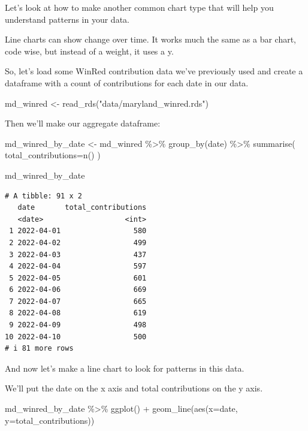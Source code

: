 \documentclass[
  letterpaper,
  DIV=11,
  numbers=noendperiod]{scrreprt}
\newenvironment{Shaded}{\begin{snugshade}}{\end{snugshade}}
\newcommand{\AttributeTok}[1]{\textcolor[rgb]{0.40,0.45,0.13}{#1}}
\newcommand{\FunctionTok}[1]{\textcolor[rgb]{0.28,0.35,0.67}{#1}}
\newcommand{\NormalTok}[1]{\textcolor[rgb]{0.00,0.23,0.31}{#1}}
\newcommand{\OtherTok}[1]{\textcolor[rgb]{0.00,0.23,0.31}{#1}}
\newcommand{\SpecialCharTok}[1]{\textcolor[rgb]{0.37,0.37,0.37}{#1}}
\newcommand{\StringTok}[1]{\textcolor[rgb]{0.13,0.47,0.30}{#1}}
\begin{document}
Let's look at how to make another common chart type that will help you
understand patterns in your data.

Line charts can show change over time. It works much the same as a bar
chart, code wise, but instead of a weight, it uses a y.

So, let's load some WinRed contribution data we've previously used and
create a dataframe with a count of contributions for each date in our
data.

\begin{Shaded}
\begin{Highlighting}[]
\NormalTok{md\_winred }\OtherTok{\textless{}{-}} \FunctionTok{read\_rds}\NormalTok{(}\StringTok{"data/maryland\_winred.rds"}\NormalTok{)}
\end{Highlighting}
\end{Shaded}

Then we'll make our aggregate dataframe:

\begin{Shaded}
\begin{Highlighting}[]
\NormalTok{md\_winred\_by\_date }\OtherTok{\textless{}{-}}\NormalTok{ md\_winred }\SpecialCharTok{\%\textgreater{}\%}
  \FunctionTok{group\_by}\NormalTok{(date) }\SpecialCharTok{\%\textgreater{}\%}
  \FunctionTok{summarise}\NormalTok{(}
    \AttributeTok{total\_contributions=}\FunctionTok{n}\NormalTok{()}
\NormalTok{  )}

\NormalTok{md\_winred\_by\_date }
\end{Highlighting}
\end{Shaded}

\begin{verbatim}
# A tibble: 91 x 2
   date       total_contributions
   <date>                   <int>
 1 2022-04-01                 580
 2 2022-04-02                 499
 3 2022-04-03                 437
 4 2022-04-04                 597
 5 2022-04-05                 601
 6 2022-04-06                 669
 7 2022-04-07                 665
 8 2022-04-08                 619
 9 2022-04-09                 498
10 2022-04-10                 500
# i 81 more rows
\end{verbatim}

And now let's make a line chart to look for patterns in this data.

We'll put the date on the x axis and total contributions on the y axis.

\begin{Shaded}
\begin{Highlighting}[]
\NormalTok{md\_winred\_by\_date }\SpecialCharTok{\%\textgreater{}\%}
  \FunctionTok{ggplot}\NormalTok{() }\SpecialCharTok{+} 
  \FunctionTok{geom\_line}\NormalTok{(}\FunctionTok{aes}\NormalTok{(}\AttributeTok{x=}\NormalTok{date, }\AttributeTok{y=}\NormalTok{total\_contributions))}
\end{Highlighting}
\end{Shaded}
\end{document}
